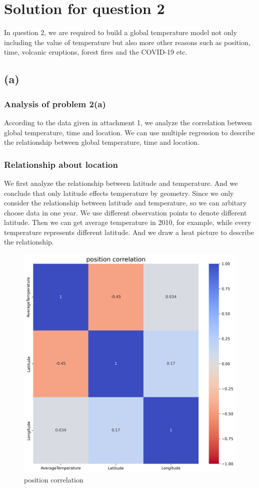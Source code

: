\documentclass{apmcmthesis}
\begin{document}
\section{Solution for question 2}
In question 2, we are required to build a global temperature model not only including the value of temperature 
but also more other reasons such as position, time, volcanic eruptions, forest fires and the COVID-19 etc.

\subsection{(a)}
\subsubsection{Analysis of problem 2(a)}
According to the data given in attachment 1, we analyze the correlation between global temperature, time and location.
We can use multiple regression to describe the relationship between global temperature, time and location. 

\subsubsection{Relationship about location}
We first analyze the relationship between latitude and temperature. 
And we conclude that only latitude effects temperature by geometry.
Since we only consider the relationship between latitude and temperature, so we can arbitary choose data in one year.
We use different observation points to denote different latitude.
Then we can get average temperature in 2010, for example, while every temperature represents different latitude. 
And we draw a heat picture to describe the relationship.

\begin{figure}[htbp]
  \centering
  \includegraphics[scale=0.4]{position correlation.png}
  \caption{position correlation}
\end{figure}
\end{document}
